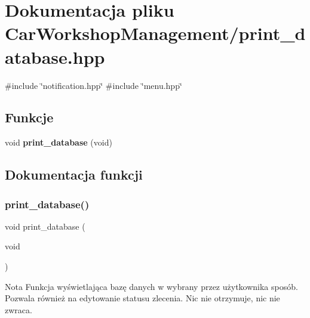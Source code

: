 \section{Dokumentacja pliku Car\+Workshop\+Management/print\+\_\+database.hpp}
\label{print__database_8hpp}
{\ttfamily \#include \char`\"{}notification.\+hpp\char`\"{}}\newline
{\ttfamily \#include \char`\"{}menu.\+hpp\char`\"{}}\newline
\subsection*{Funkcje}
\begin{DoxyCompactItemize}
\item 
void \textbf{ print\+\_\+database} (void)
\end{DoxyCompactItemize}


\subsection{Dokumentacja funkcji}
\mbox{\label{print__database_8hpp_a649281e08933aa2c789c20b1050ea86b}} 
\subsubsection{print\_database()}
{\footnotesize\ttfamily void print\+\_\+database (\begin{DoxyParamCaption}\item[{void}]{ }\end{DoxyParamCaption})}


\begin{DoxyCode}{0}
\end{DoxyCode}
 \begin{DoxyNote}{Nota}
Funkcja wyświetlająca bazę danych w wybrany przez użytkownika sposób. Pozwala również na edytowanie statusu zlecenia. Nic nie otrzymuje, nic nie zwraca. 
\end{DoxyNote}
